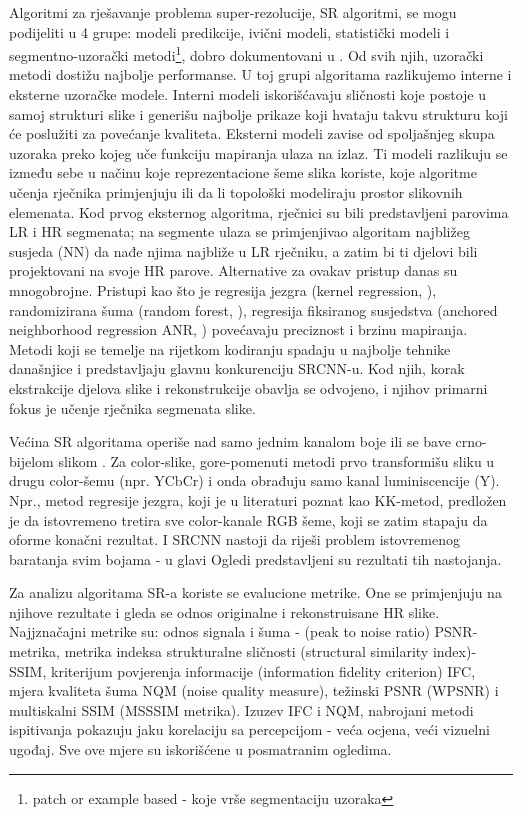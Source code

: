 \documentclass[12pt]{report}
\numberwithin{equation}{section}
\begin{document}
Algoritmi za rješavanje problema super-rezolucije, SR algoritmi, \cite{alg} se mogu podijeliti u 4 grupe: modeli predikcije, ivični modeli, statistički modeli i segmentno-uzorački metodi\footnote{patch or example based - koje vrše segmentaciju uzoraka}, dobro dokumentovani u \cite{alg2}. Od svih njih, uzorački metodi dostižu najbolje performanse. U toj grupi algoritama razlikujemo interne i eksterne uzoračke modele. Interni modeli iskorišćavaju sličnosti koje postoje u samoj strukturi slike i generišu najbolje prikaze koji hvataju takvu strukturu koji će poslužiti za povećanje kvaliteta. Eksterni modeli zavise od spoljašnjeg skupa uzoraka preko kojeg uče funkciju mapiranja ulaza na izlaz. Ti modeli razlikuju se između sebe u načinu koje reprezentacione šeme slika koriste, koje algoritme učenja rječnika primjenjuju ili da li topološki modeliraju prostor slikovnih elemenata. Kod prvog eksternog algoritma, rječnici su bili predstavljeni parovima LR i HR segmenata; na segmente ulaza se primjenjivao algoritam najbližeg susjeda (NN) da nađe njima najbliže u LR rječniku, a zatim bi ti djelovi bili projektovani na svoje HR parove. Alternative za ovakav pristup danas su mnogobrojne. Pristupi kao što je regresija jezgra (kernel regression, \cite{kernel}), randomizirana šuma (random forest, \cite{forest}), regresija fiksiranog susjedstva (anchored neighborhood regression ANR, \cite{anr}) povećavaju preciznost i brzinu mapiranja. Metodi koji se temelje na rijetkom kodiranju spadaju u najbolje tehnike današnjice i predstavljaju glavnu konkurenciju SRCNN-u. Kod njih, korak ekstrakcije djelova slike i rekonstrukcije obavlja se odvojeno, i njihov primarni fokus je učenje rječnika segmenata slike.   


Većina SR algoritama operiše nad samo jednim kanalom boje ili se bave crno-bijelom slikom . Za color-slike, gore-pomenuti metodi prvo transformišu sliku u drugu color-šemu (npr. YCbCr) i onda obrađuju samo kanal luminiscencije (Y).  Npr., metod regresije jezgra, koji je u literaturi poznat kao KK-metod, predložen je da istovremeno tretira sve color-kanale RGB šeme, koji se zatim stapaju da oforme konačni rezultat. I SRCNN nastoji da riješi problem istovremenog baratanja svim bojama - u glavi Ogledi predstavljeni su rezultati tih nastojanja.

Za analizu algoritama SR-a koriste se evalucione metrike. One se primjenjuju na njihove rezultate i gleda se odnos originalne i rekonstruisane HR slike. Najjznačajni metrike \cite{alg2} su: odnos signala i šuma - (peak to noise ratio) PSNR-metrika, metrika indeksa strukturalne sličnosti (structural similarity index)- SSIM, kriterijum povjerenja informacije (information fidelity criterion) IFC, mjera kvaliteta šuma NQM (noise quality measure), težinski PSNR (WPSNR) i multiskalni SSIM (MSSSIM metrika). Izuzev IFC i NQM, nabrojani metodi ispitivanja pokazuju jaku korelaciju sa percepcijom - veća ocjena, veći vizuelni ugođaj. Sve ove mjere su iskorišćene u posmatranim ogledima.    
\end{document}
